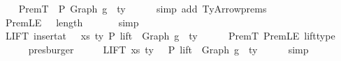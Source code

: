 \begin{isabellebody}
\isanewline
\ \ \isamarkupfalse%
\ PremT{\isacharcolon}{\kern0pt}\ {\isachardoublequoteopen}{\isasymGamma}{}\ {\isasymturnstile}{\isacharbraceleft}{\kern0pt}P{\isacharbraceright}{\kern0pt}\ {\isacharparenleft}{\kern0pt}Graph\ g{}{\isacharparenright}{\kern0pt}\ {\isacharcolon}{\kern0pt}\ ty{}{\isachardoublequoteclose}\isanewline
\ \ \ \ \isamarkupfalse%
\ {\isacharparenleft}{\kern0pt}simp\ add{\isacharcolon}{\kern0pt}\ TyArrow{\isachardot}{\kern0pt}prems{\isacharparenleft}{\kern0pt}{}{\isacharparenright}{\kern0pt}{\isacharparenright}{\kern0pt}\isanewline
\ \ \isamarkupfalse%
\ PremLE{\isacharcolon}{\kern0pt}\ {\isachardoublequoteopen}{}\ {\isasymle}\ length\ {\isasymGamma}{}{\isachardoublequoteclose}\isanewline
\ \ \ \ \isamarkupfalse%
\ simp\isanewline
\isanewline
\ \ \isamarkupfalse%
\ \isamarkupfalse%
\ LIFT{}{\isacharcolon}{\kern0pt}\ {\isachardoublequoteopen}insert{\isacharunderscore}{\kern0pt}at\ {\isasymGamma}{}\ {}\ {\isacharparenleft}{\kern0pt}xs{\isacharprime}{\kern0pt}{\isacharcomma}{\kern0pt}\ ty{}{\isacharprime}{\kern0pt}{\isacharparenright}{\kern0pt}\ {\isasymturnstile}{\isacharbraceleft}{\kern0pt}P{\isacharbraceright}{\kern0pt}\ {\isacharparenleft}{\kern0pt}lift\ {}\ {\isacharparenleft}{\kern0pt}Graph\ g{}{\isacharparenright}{\kern0pt}{\isacharparenright}{\kern0pt}\ {\isacharcolon}{\kern0pt}\ ty{}{\isachardoublequoteclose}\isanewline
\ \ \ \ \isamarkupfalse%
\ PremT\ PremLE\ lift{\isacharunderscore}{\kern0pt}type\isanewline
\ \ \ \ \isamarkupfalse%
\ presburger\isanewline
\ \ \isamarkupfalse%
\ \isamarkupfalse%
\ LIFT{\isacharcolon}{\kern0pt}\ {\isachardoublequoteopen}{\isacharparenleft}{\kern0pt}xs{\isacharprime}{\kern0pt}{\isacharcomma}{\kern0pt}\ ty{}{\isacharprime}{\kern0pt}{\isacharparenright}{\kern0pt}\ {\isacharhash}{\kern0pt}\ {\isasymGamma}{}\ {\isasymturnstile}{\isacharbraceleft}{\kern0pt}P{\isacharbraceright}{\kern0pt}\ {\isacharparenleft}{\kern0pt}lift\ {}\ {\isacharparenleft}{\kern0pt}Graph\ g{}{\isacharparenright}{\kern0pt}{\isacharparenright}{\kern0pt}\ {\isacharcolon}{\kern0pt}\ ty{}{\isachardoublequoteclose}\isanewline
\ \ \ \ \isamarkupfalse%
\ simp\isanewline
\isanewline
\ \ \isamarkupfalse%

\end{isabellebody}
